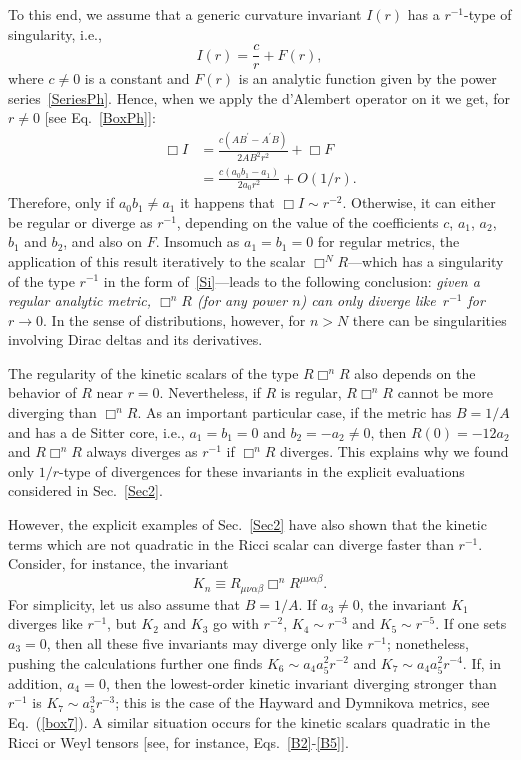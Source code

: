 \documentclass[aps,prd,a4paper,twocolumn,showpacs,showkeys,preprintnumbers,amsmath,amssymb,nofootinbib,usenames,dvipsnames]{revtex4-2}
\newcommand{\be}{\begin{eqnarray}}
\def\beq{\begin{equation}}
\def\eeq{\end{equation}}
\newcommand{\eq}[1]{(\ref{#1})}
\def\al{\alpha}
\def\be{\beta}
\begin{document}
To this end, we assume that a generic curvature invariant $I(r)$ has a $r^{-1}$-type of singularity, {i.e.}, 
%
\beq \label{Si}
I(r) = \frac{c}{r} + F(r) ,
\eeq
where $c\neq 0$ is a constant and  $F(r)$ is an analytic function given by the power series~\eqref{SeriesPh}.
Hence, when we apply the d'Alembert operator on it we get, for $r \neq 0$ [see Eq.~\eqref{BoxPh}]:
%
\beq \label{BoxSi}
\begin{split}
\Box I &=  \frac{c(A B^\prime - A^\prime B)}{2 A B^2 r^2} + \Box F 
\\
&= \frac{c(a_0 b_1 - a_1)}{2 a_0 r^{2}} + O \left( 1/r \right).
\end{split}
\eeq
%
Therefore, only if $a_0 b_1 \neq a_1$ it happens that $\Box I \sim r^{-2}$. Otherwise, it can either be regular or diverge as $r^{-1}$, depending on the value of the coefficients $c$, $a_1$, $a_2$, $b_1$ and $b_2$, and also on $F$. 
Insomuch as $a_1 = b_1 = 0$ for regular metrics, the application of this result iteratively to the scalar $\Box^N R$---which has a singularity of the type $r^{-1}$ in the form of~\eqref{Si}---leads to the following conclusion: {\it given a regular analytic metric, 
$\Box^n R$ (for any power $n$) can only diverge like~$r^{-1}$ for $r \to 0$}.
In the sense of distributions, however,  for $n > N$ there can be singularities involving Dirac deltas and its derivatives.

The regularity of the kinetic scalars of the type $R \Box^n R$ also depends on the behavior of $R$ near $r=0$. Nevertheless, if $R$ is regular, $R \Box^n R$ cannot be more diverging than $\Box^n R$. As an important particular case, if the metric has $B=1/A$ and has a de Sitter core, {i.e.}, $a_1=b_1=0$ and $b_2 = - a_2 \neq 0$, then $R(0) = -12 a_2$ and $R \Box^n R$ always diverges as $r^{-1}$ if $\Box^n R$ diverges. This explains why we found only $1/r$-type of divergences for these invariants in the explicit evaluations considered in Sec.~\ref{Sec2}.  

However, the explicit examples of Sec.~\ref{Sec2} have also shown that the kinetic terms which are not quadratic in the Ricci scalar can diverge faster than $r^{-1}$. Consider, for instance, the invariant
\beq
K_n \equiv R_{\mu\nu\al\be} \Box^n R^{\mu\nu\al\be}.
\eeq 
For simplicity, let us also assume that $B=1/A$. If $a_3 \neq 0$, the invariant $K_1$ diverges like $r^{-1}$, but $K_2$ and $K_3$ go with $r^{-2}$, $K_4 \sim r^{-3}$ and $K_5 \sim r^{-5}$. If one sets $a_3=0$, then all these five invariants may diverge only like $r^{-1}$; nonetheless, pushing the calculations further one finds $K_6 \sim  a_4 a_5^2 r^{-2}$ and $K_7 \sim  a_4 a_5^2 r^{-4}$. If, in addition, $a_4 = 0$, then the lowest-order kinetic invariant diverging stronger than $r^{-1}$ is $K_7 \sim a_5^3 r^{-3}$; this is the case of the Hayward and Dymnikova metrics, see Eq.~\eq{box7}.
A similar situation occurs for the kinetic scalars quadratic in the Ricci or Weyl tensors [see, for instance, Eqs.~\eqref{B2}-\eqref{B5}].
\end{document}
